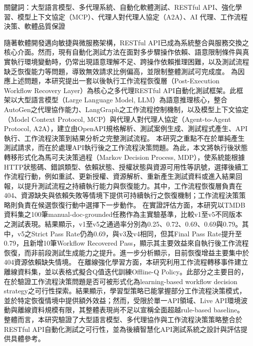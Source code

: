 \begin{ZhAbstract}
    \begin{ZhAbstractItems}
        \noindent \text 關鍵詞：大型語言模型、多代理系統、自動化軟體測試、RESTful API、強化學習、模型上下文協定（MCP）、代理人對代理人協定（A2A）、AI 代理、工作流程決策、軟體品質保證
    \end{ZhAbstractItems}

    \begin{ZhAbstractDescription}
        
        \text 隨著軟體開發邁向敏捷與微服務架構，RESTful API已成為系統整合與服務交換之核心介面。然而，現有自動化測試方法在面對多步驟操作依賴、語意限制條件與真實執行環境變動時，仍常出現語意理解不足、跨操作依賴推理困難，以及測試流程缺乏恢復能力等問題，導致無效請求比例偏高，並限制整體測試可完成度。
        \text 為因應上述問題，本研究提出一套以後執行工作流程恢復層（Post-Execution Workflow Recovery Layer）為核心之多代理RESTful API自動化測試框架。此框架以大型語言模型（Large Language Model, LLM）為語意推理核心，整合AutoGen之代理協作能力、LangGraph之工作流程控制機制，以及模型上下文協定（Model Context Protocol, MCP）與代理人對代理人協定（Agent-to-Agent Protocol, A2A），建立由OpenAPI規格解析、測試案例生成、測試程式產生、API執行、工作流程決策到結果分析之完整測試流程。
        \text 本研究之重點不在於單純產生測試請求，而在於處理API執行後之工作流程決策問題。為此，本文將執行後狀態轉移形式化為馬可夫決策過程（Markov Decision Process, MDP），使系統能根據HTTP狀態碼、錯誤類型、依賴狀態、授權狀態與資源可用性等訊號，選擇後續工作流程行動，例如重試、更新授權、資源解析、重新產生測試資料或進入結果回報，以提升測試流程之持續執行能力與恢復能力。其中，工作流程恢復層負責在404、資源缺失與依賴失敗等情境下提供可持續執行之恢復機制；工作流程決策策略則負責在候選恢復行動中選擇下一步動作。
        \text 在實證評估方面，本研究以TMDB資料集之100筆manual-doc-grounded任務作為主實驗基準，比較v1至v5不同版本之測試表現。結果顯示，v1至v5之通過率分別為0.25、0.72、0.69、0.69與0.79。其中，v5之Strict Pass Rate仍為0.69，與v3及v4相同，但其Final Pass Rate提升至0.79，且新增10筆Workflow Recovered Pass，顯示其主要效益來自執行後工作流程恢復，而非前段測試生成能力之提升。進一步分析顯示，目前恢復增益主要集中於404資源依賴缺失情境。
        \text 在離線強化學習方面，本研究利用工作流程轉移事件建立離線資料集，並以表格式擬合Q值迭代訓練Offline-Q Policy。此部分之主要目的，在於驗證工作流程決策問題是否可被形式化為learning-based workflow decision strategy之可行性探索。結果顯示，學習型策略已能掌握部分工作流程決策模式，並於特定恢復情境中提供額外效益；然而，受限於單一API領域、Live API環境波動與離線資料規模有限，其整體表現尚不足以宣稱全面超越rule-based baseline。整體而言，本研究驗證了大型語言模型、多代理協作與工作流程決策策略整合於RESTful API自動化測試之可行性，並為後續智慧化API測試系統之設計與評估提供具體參考。

    \end{ZhAbstractDescription}
    
\end{ZhAbstract}